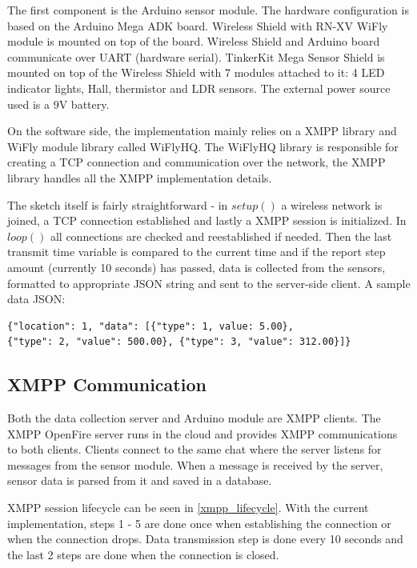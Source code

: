 The first component is the Arduino sensor module. The hardware configuration is based on the Arduino Mega ADK board. Wireless Shield with RN-XV WiFly module is mounted on top of the board. Wireless Shield and Arduino board communicate over UART (hardware serial). TinkerKit Mega Sensor Shield is mounted on top of the Wireless Shield with 7 modules attached to it: 4 LED indicator lights, Hall, thermistor and LDR sensors. The external power source used is a 9V battery.

On the software side, the implementation mainly relies on a XMPP library and WiFly module library called WiFlyHQ. The WiFlyHQ library is responsible for creating a TCP connection and communication over the network, the XMPP library handles all the XMPP implementation details. 

The sketch itself is fairly straightforward - in $setup()$ a wireless network is joined, a TCP connection established and lastly a XMPP session is initialized. In $loop()$ all connections are checked and reestablished if needed. Then the last transmit time variable is compared to the current time and if the report step amount (currently 10 seconds) has passed, data is collected from the sensors, formatted to appropriate JSON string and sent to the server-side client. A sample data JSON:

\begin{center}
\begin{lstlisting}
{"location": 1, "data": [{"type": 1, value: 5.00}, 
{"type": 2, "value": 500.00}, {"type": 3, "value": 312.00}]}
\end{lstlisting}
\end{center}

\subsection{XMPP Communication}

Both the data collection server and Arduino module are XMPP clients. The XMPP OpenFire server runs in the cloud and provides XMPP communications to both clients. Clients connect to the same chat where the server listens for messages from the sensor module. When a message is received by the server, sensor data is parsed from it and saved in a database.

XMPP session lifecycle can be seen in \autoref{xmpp_lifecycle}. With the current implementation, steps 1 - 5 are done once when establishing the connection or when the connection drops. Data transmission step is done every 10 seconds and the last 2 steps are done when the connection is closed.

